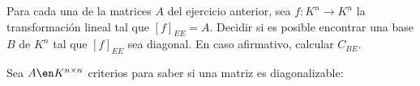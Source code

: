 \begin{enunciado}{\ejercicio}
  Para cada una de la matrices $A$ del ejercicio anterior, sea $f: K^n \to K^n$ la
  transformación lineal tal que $[f]_{EE} = A$. Decidir si es posible encontrar una base
  $B$ de $K^n$ tal que $[f]_{EE}$ sea diagonal. En caso afirmativo, calcular $C_{BE}$.
\end{enunciado}

Sea $A \en K^{n \times n}$ criterios para saber si una matriz es diagonalizable:
\hacer

